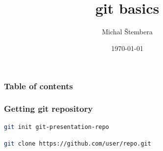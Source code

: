 \documentclass[hyperref={pdfpagelabels=false}]{beamer}
\title{git basics}
\author{Michal \v Stembera}
\date{\today}
\begin{document}
\begin{frame}
	\titlepage
\end{frame} 

\begin{frame}
\frametitle{Table of contents}
\tableofcontents
\end{frame} 

\begin{frame}[fragile]
\frametitle{Getting git repository}
	\begin{lstlisting}[language=bash, caption={Creating new repository}]
	git init git-presentation-repo
	\end{lstlisting}

	\begin{lstlisting}[language=bash, caption={Clone remote repository}]
	git clone https://github.com/user/repo.git	
	\end{lstlisting}
\end{frame} 
\end{document}
